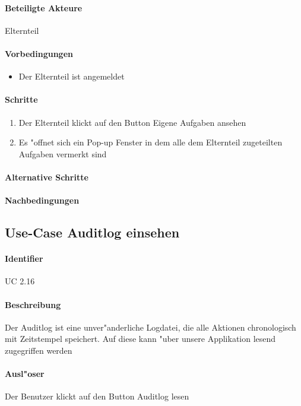	\paragraph{Beteiligte Akteure}   \leavevmode \newline
	Elternteil
	\paragraph{Vorbedingungen}
	\begin{itemize}
		\item Der Elternteil ist angemeldet
	\end{itemize}
	
	\paragraph{Schritte}
	\begin{enumerate}
		\item Der Elternteil klickt auf den Button \dq Eigene Aufgaben ansehen \dq
		\item Es "offnet sich ein Pop-up Fenster in dem alle dem Elternteil zugeteilten Aufgaben vermerkt sind
	\end{enumerate}
  
	\paragraph{Alternative Schritte}
	\paragraph{Nachbedingungen}

  
  
  
  \newpage
 \subsection{Use-Case Auditlog einsehen}
  \paragraph{Identifier}
  UC 2.16
  \paragraph{Beschreibung}
  Der Auditlog ist eine unver"anderliche Logdatei, die alle Aktionen chronologisch mit Zeitstempel speichert. Auf diese kann "uber unsere Applikation lesend zugegriffen werden 
  \paragraph{Ausl"oser}
  Der Benutzer klickt auf den Button \dq Auditlog lesen\dq
